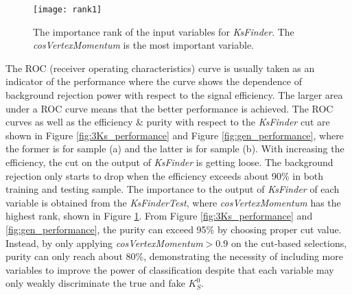 \begin{figure}[htpb]
	\centering 
	\texttt{[image: rank1]}
	\caption{The importance rank of the input variables for \textit{KsFinder}. The \textit{cosVertexMomentum} is the most important variable.}
	\label{fig:rankks} 
\end{figure}
The ROC (receiver operating characteristics) curve is usually taken as an indicator of the performance where the curve shows the dependence of background rejection power with respect to the signal efficiency. The larger area under a ROC curve means that the better performance is achieved. The ROC curves as well as  the efficiency \& purity with respect to the  \textit{KsFinder} cut are shown in Figure \ref{fig:3Ks_performance}  and Figure  \ref{fig:gen_performance}, where the former is for sample (a) and the latter is for sample (b). With increasing the efficiency, the cut on the output of \textit{KsFinder} is getting loose. The background rejection only starts to drop when the efficiency exceeds about 90\% in both training and testing sample. The importance to the output of \textit{KsFinder} of each variable is obtained from the \textit{KsFinderTest}, where \textit{cosVertexMomentum} has the highest rank, shown in Figure \ref{fig:rankks}. From Figure \ref{fig:3Ks_performance} and \ref{fig:gen_performance}, the purity can exceed 95\% by choosing proper cut value. Instead, by only applying \textit{cosVertexMomentum}$>0.9$ on the cut-based selections, purity can only reach about 80\%, demonstrating the necessity of including more variables to improve the power of classification despite that each variable may only weakly discriminate the true and fake $K_S^0$.

